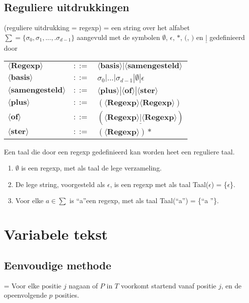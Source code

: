 \documentclass{report}
\begin{document}
\subsection{Reguliere uitdrukkingen}
(reguliere uitdrukking = regexp) = een string over het alfabet $\sum = \{\sigma_0, \sigma_1, ..., .\sigma_{d - 1}\}$ aangevuld met de symbolen $\emptyset$, $\epsilon$, $*$, $($, $)$ en $\underline{|}$ gedefinieerd door
\begin{table}[ht]
	\centering
	\begin{tabular}{l l l}
		$\langle \textbf{Regexp} \rangle$ & $::=$ & $\langle \textbf{basis} \rangle | \langle \textbf{samengesteld} \rangle$ \\
		$\langle \textbf{basis} \rangle$ & $::=$ & $\sigma_0 | ... | \sigma_{d - 1} | \emptyset | \epsilon$ \\
		$\langle \textbf{samengesteld} \rangle$ & $::=$ & $\langle \textbf{plus} \rangle  |  \langle \textbf{of} \rangle | \langle \textbf{ster} \rangle$ \\
		$\langle \textbf{plus} \rangle $ & $::=$ & $(\langle \textbf{Regexp} \rangle \langle \textbf{Regexp} \rangle)$ \\
		$\langle \textbf{of} \rangle $ & $::=$ & $(\langle \textbf{Regexp} \rangle \underline{|} \langle \textbf{Regexp} \rangle)$ \\
		$\langle \textbf{ster} \rangle $ & $::=$ & $(\langle \textbf{Regexp} \rangle)*$
	\end{tabular}
\end{table}
Een taal die door een regexp gedefinieerd kan worden heet een reguliere taal. 
\begin{enumerate}
	\item $\emptyset$ is een regexp, met als taal de lege verzameling.
	\item De lege string, voorgesteld als $\epsilon$, is een regexp met als taal Taal($\epsilon$) = \{$\epsilon$\}.
	\item Voor elke $a \in \sum$ is \textquotedblleft a\textquotedblright een regexp, met als taal Taal(\textquotedblleft a\textquotedblright ) = \{\textquotedblleft a \textquotedblright\}.
\end{enumerate}

\section{Variabele tekst}
\subsection{Eenvoudige methode}
= Voor elke positie $j$ nagaan of $P$ in $T$ voorkomt startend vanaf positie $j$, en de opeenvolgende $p$ posities.
\end{document}
